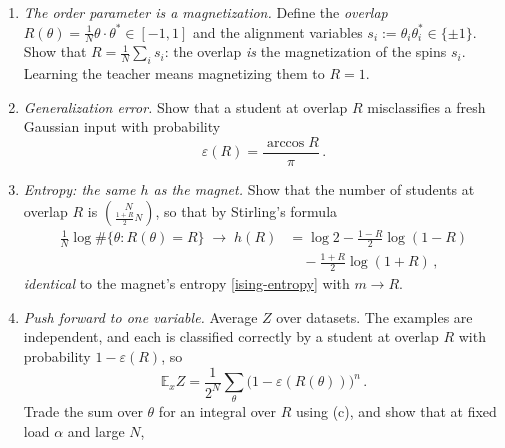 \documentclass[11pt]{article}
\newcommand{\E}{\mathbb{E}}
\begin{document}
\begin{exercise}
\label{ex:ising}
\important
\begin{enumerate}
    \item \emph{The order parameter is a magnetization.} Define the \emph{overlap} $R(\theta) = \frac{1}{N}\theta\cdot\theta^*\in[-1,1]$ and the alignment variables $s_i := \theta_i\theta_i^*\in\{\pm1\}$. Show that $R = \frac{1}{N}\sum_i s_i$: the overlap \emph{is} the magnetization of the spins $s_i$. Learning the teacher means magnetizing them to $R=1$.
    \item\label{ex:ising-generr} \emph{Generalization error.} Show that a student at overlap $R$ misclassifies a fresh Gaussian input with probability
    \begin{equation}
        \varepsilon(R) = \frac{\arccos R}{\pi}\,. \label{eps-of-R}
    \end{equation}
    \item\label{ex:ising-count} \emph{Entropy: the same $h$ as the magnet.} Show that the number of students at overlap $R$ is $\binom{N}{\frac{1+R}{2}N}$, so that by Stirling's formula
    \begin{equation}
        \begin{aligned}
        \frac{1}{N}\log\#\{\theta : R(\theta) = R\} \;\to\; h(R) &= \log 2 - \frac{1-R}{2}\log(1-R) \\ &\quad - \frac{1+R}{2}\log(1+R)\,,
        \end{aligned}
    \end{equation}
    \emph{identical} to the magnet's entropy \eqref{ising-entropy} with $m\to R$.
    \item\label{ex:ising-pushforward} \emph{Push forward to one variable.} Average $Z$ over datasets. The examples are independent, and each is classified correctly by a student at overlap $R$ with probability $1-\varepsilon(R)$, so
    \begin{equation}
        \E_x Z = \frac{1}{2^N}\sum_\theta\big(1-\varepsilon(R(\theta))\big)^n\,.
    \end{equation}
    Trade the sum over $\theta$ for an integral over $R$ using (c), and show that at fixed load $\alpha$ and large $N$,
    \begin{equation}

\end{equation}
\end{enumerate}
\end{exercise}
\end{document}
